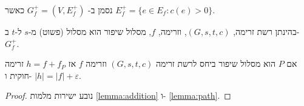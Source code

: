 נסמן ב-
$G_f^+ = (V, E_f^+)$
כאשר 
$E_f^+ = \{e \in E_f : c(e) > 0 \}$.

\begin{definition}
בהינתן רשת זרימה,
$(G, s, t, c)$,
וזרימה, $f$, 
מסלול שיפור הוא מסלול (פשוט) מ-$s$ ל-$t$ ב-%
$G_f^+$.
\end{definition}

\begin{lemma}
\label{lemma:improve}
אם $P$ הוא מסלול שיפור ביחס לרשת זרימה 
$(G, s, t, c)$
וזרימה
$f$
אז
$h = f + f_P$
זרימה חוקית ו-%
${|h| = |f| + \varepsilon}$.
\end{lemma}

\begin{proof}
נובע ישירות מלמות
\ref{lemma:addition}
ו-%
\ref{lemma:path}.
\end{proof}
